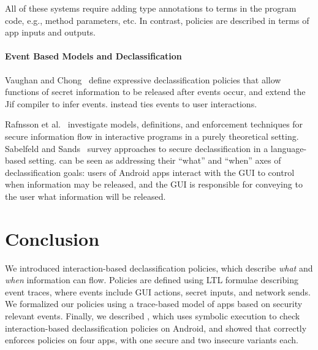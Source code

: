 All of these systems require adding type annotations to terms in the
program code, e.g., method parameters, etc. In contrast, \toolname{}
policies are described in terms of app inputs and
outputs.

\paragraph*{Event Based Models and Declassification}

Vaughan and Chong~\cite{Vaughan:2011} define expressive declassification policies that
allow functions of secret information to be released after events occur, and
extend the Jif compiler to infer events.  \toolname instead 
ties events to user interactions.

Rafnsson et al.~\cite{Rafnsson:12} investigate models, definitions, and enforcement
techniques for secure information flow in interactive programs in a
purely theoretical setting.
%
Sabelfeld and Sands~\cite{Sabelfeld:2009} survey approaches to
secure declassification in a language-based setting.  \toolname
can be seen as addressing their ``what'' and ``when'' axes of
declassification goals:  users of Android apps interact with the GUI
to control when information may be released, and the GUI is responsible
for conveying to the user what information will be released.

\section{Conclusion}
\label{sec:conclusion}

We introduced interaction-based declassification policies, which describe
\emph{what} and \emph{when} information can flow. Policies are defined
using LTL formulae describing event traces, where events include GUI
actions, secret inputs, and network sends. We formalized our policies
using a trace-based model of apps based on security relevant events.
Finally, we described \toolname{}, which uses symbolic
execution to check interaction-based declassification policies on Android, and
showed that \toolname{} correctly enforces policies on four apps,
with one secure and two insecure variants each.

